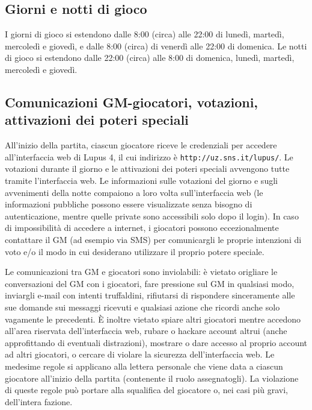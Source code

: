 \documentclass[a4paper,10pt]{article}
\begin{document}
\subsection{Giorni e notti di gioco}

I giorni di gioco si estendono dalle 8:00 (circa) alle 22:00 di lunedì, martedì, mercoledì e giovedì, e dalle 8:00 (circa) di venerdì alle 22:00 di domenica.
Le notti di gioco si estendono dalle 22:00 (circa) alle 8:00 di domenica, lunedì, martedì, mercoledì e giovedì.



\subsection{Comunicazioni GM-giocatori, votazioni, attivazioni dei poteri speciali}

All'inizio della partita, ciascun giocatore riceve le credenziali per accedere all'interfaccia web di Lupus 4, il cui indirizzo è \verb|http://uz.sns.it/lupus/|.
Le votazioni durante il giorno e le attivazioni dei poteri speciali avvengono tutte tramite l'interfaccia web. Le informazioni sulle votazioni del giorno e sugli avvenimenti della notte compaiono a loro volta sull'interfaccia web (le informazioni pubbliche possono essere visualizzate senza bisogno di autenticazione, mentre quelle private sono accessibili solo dopo il login).
In caso di impossibilità di accedere a internet, i giocatori possono eccezionalmente contattare il GM (ad esempio via SMS) per comunicargli le proprie intenzioni di voto e/o il modo in cui desiderano utilizzare il proprio potere speciale.

Le comunicazioni tra GM e giocatori sono inviolabili: è vietato origliare le conversazioni del GM con i giocatori, fare pressione sul GM in qualsiasi modo, inviargli e-mail con intenti truffaldini, rifiutarsi di rispondere sinceramente alle sue domande sui messaggi ricevuti e qualsiasi azione che ricordi anche solo vagamente le precedenti.
È inoltre vietato spiare altri giocatori mentre accedono all'area riservata dell'interfaccia web, rubare o hackare account altrui (anche approfittando di eventuali distrazioni), mostrare o dare accesso al proprio account ad altri giocatori, o cercare di violare la sicurezza dell'interfaccia web.
Le medesime regole si applicano alla lettera personale che viene data a ciascun giocatore all'inizio della partita (contenente il ruolo assegnatogli).
La violazione di queste regole può portare alla squalifica del giocatore o, nei casi più gravi, dell'intera fazione.
\end{document}
